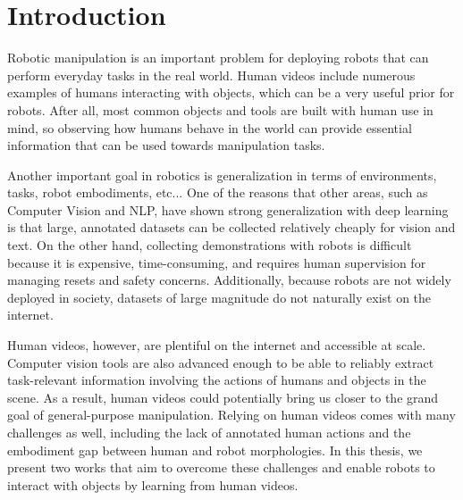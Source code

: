 \chapter{Introduction}

Robotic manipulation is an important problem for deploying robots that can perform everyday tasks in the real world. Human videos include numerous examples of humans interacting with objects, which can be a very useful prior for robots. After all, most common objects and tools are built with human use in mind, so observing how humans behave in the world can provide essential information that can be used towards manipulation tasks.

Another important goal in robotics is generalization in terms of environments, tasks, robot embodiments, etc... One of the reasons that other areas, such as Computer Vision and NLP, have shown strong generalization with deep learning is that large, annotated datasets can be collected relatively cheaply for vision and text. On the other hand, collecting demonstrations with robots is difficult because it is expensive, time-consuming, and requires human supervision for managing resets and safety concerns. Additionally, because robots are not widely deployed in society, datasets of large magnitude do not naturally exist on the internet.

Human videos, however, are plentiful on the internet and accessible at scale. Computer vision tools are also advanced enough to be able to reliably extract task-relevant information involving the actions of humans and objects in the scene. As a result, human videos could potentially bring us closer to the grand goal of general-purpose manipulation. Relying on human videos comes with many challenges as well, including the lack of annotated human actions and the embodiment gap between human and robot morphologies. In this thesis, we present two works that aim to overcome these challenges and enable robots to interact with objects by learning from human videos.

